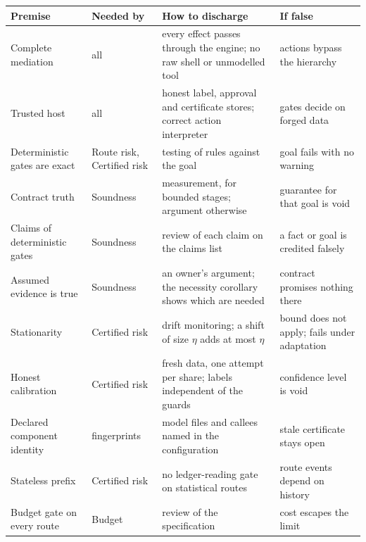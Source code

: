 \begin{center}
\renewcommand{\arraystretch}{1.2}
\footnotesize
\begin{tabularx}{\textwidth}{@{}p{2.9cm}p{2.2cm}XX@{}}
\toprule
\textbf{Premise} & \textbf{Needed by} & \textbf{How to discharge} & \textbf{If false}\\
\midrule
Complete mediation & all & every effect passes through the engine; no raw shell or unmodelled tool & actions bypass the hierarchy\\
Trusted host & all & honest label, approval and certificate stores; correct action interpreter & gates decide on forged data\\
Deterministic gates are exact & Route risk, Certified risk & testing of rules against the goal & goal fails with no warning\\
Contract truth & Soundness & measurement, for bounded stages; argument otherwise & guarantee for that goal is void\\
Claims of deterministic gates & Soundness & review of each claim on the claims list & a fact or goal is credited falsely\\
Assumed evidence is true & Soundness & an owner's argument; the necessity corollary shows which are needed & contract promises nothing there\\
Stationarity & Certified risk & drift monitoring; a shift of size $\eta$ adds at most $\eta$ & bound does not apply; fails under adaptation\\
Honest calibration & Certified risk & fresh data, one attempt per share; labels independent of the guards & confidence level is void\\
Declared component identity & fingerprints & model files and callees named in the configuration & stale certificate stays open\\
Stateless prefix & Certified risk & no ledger-reading gate on statistical routes & route events depend on history\\
Budget gate on every route & Budget & review of the specification & cost escapes the limit\\
\bottomrule
\end{tabularx}
\end{center}


